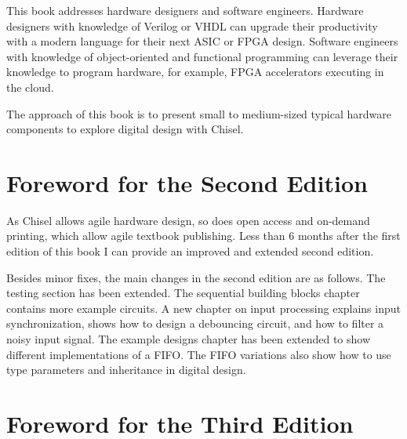 \documentclass[%
    10pt,
    headinclude, footexclude,
    openright, %
    notitlepage,
    cleardoubleempty,
    headsepline,
    pointlessnumbers,
    bibtotoc, idxtotoc,
    ]{scrbook}
\begin{document}
This book addresses hardware designers and software engineers. Hardware designers with knowledge of Verilog or VHDL can upgrade their productivity with a modern language for their next ASIC or FPGA design. Software engineers with knowledge of object-oriented and functional programming can leverage their knowledge to program hardware, for example, FPGA accelerators executing in the cloud.

The approach of this book is to present small to medium-sized typical hardware components to explore digital design with Chisel.




\section*{Foreword for the Second Edition}

As Chisel allows agile hardware design, so does open access and on-demand printing,
which allow agile textbook publishing. Less than 6 months after the first edition of this book
I can provide an improved and extended second edition.

Besides minor fixes, the main changes in the second edition are as follows.
The testing section has been extended. The sequential building blocks chapter contains
more example circuits. A new chapter on input processing explains input synchronization,
shows how to design a debouncing circuit, and how to filter a noisy input signal.
The example designs chapter has been extended to show different implementations of a FIFO.
The FIFO variations also show how to use type parameters and inheritance in digital design.

\section*{Foreword for the Third Edition}
\end{document}
